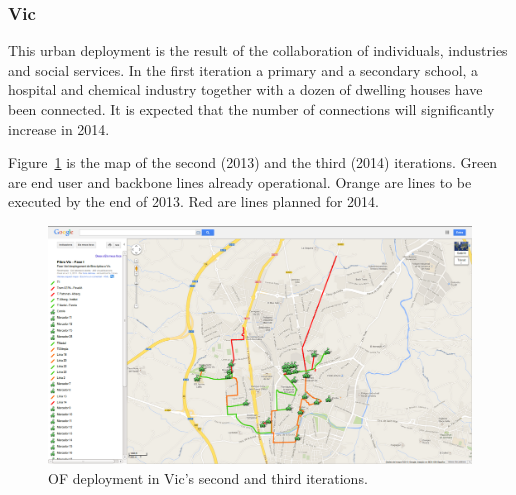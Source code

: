 \FloatBarrier
\subsubsection{Vic}
\label{dep_vic}

This urban deployment is the result of the collaboration of individuals, industries and social services. In the first iteration a primary and a secondary school, a hospital and chemical industry together with a dozen of dwelling houses have been connected. It is expected that the number of connections will significantly increase in 2014.

Figure~\ref{fig:vic_2013_detail} is the map of the second (2013) and the third (2014) iterations. Green are end user and backbone lines already operational. Orange are lines to be executed by the end of 2013. Red are lines planned for 2014.

\begin{figure}[H]
  \centering
  \includegraphics[width=0.95\linewidth]{sect2/figures/vic_2013_detail.png}
  \caption[Vic pilot: OF deployment map of 2nd and 3rd iterations]{OF deployment in Vic's second and third iterations.}
  \label{fig:vic_2013_detail}
\end{figure}


